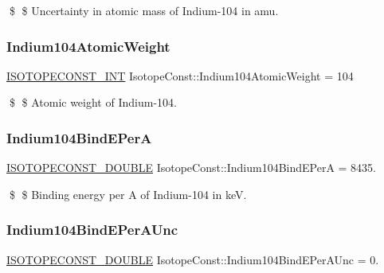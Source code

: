 \$ \$ Uncertainty in atomic mass of Indium-\/104 in amu. \mbox{\label{group___isotope_const-_indium-_in104_ga676ee40b5891e26c522fc0e9dc1ee539}} 
\subsubsection{\texorpdfstring{Indium104\+Atomic\+Weight}{Indium104AtomicWeight}}
{\footnotesize\ttfamily \mbox{\hyperlink{group___isotope_const-_macros_ga5f18360b3e99483a35c32d789e62621c}{I\+S\+O\+T\+O\+P\+E\+C\+O\+N\+S\+T\+\_\+\+I\+NT}} Isotope\+Const\+::\+Indium104\+Atomic\+Weight = 104}

\$ \$ Atomic weight of Indium-\/104. \mbox{\label{group___isotope_const-_indium-_in104_ga0b40476ffa59cae6be146df5ec3d7a75}} 
\subsubsection{\texorpdfstring{Indium104\+Bind\+E\+PerA}{Indium104BindEPerA}}
{\footnotesize\ttfamily \mbox{\hyperlink{group___isotope_const-_macros_ga8f45a7272ce02c0b4c65c44636ed719a}{I\+S\+O\+T\+O\+P\+E\+C\+O\+N\+S\+T\+\_\+\+D\+O\+U\+B\+LE}} Isotope\+Const\+::\+Indium104\+Bind\+E\+PerA = 8435.}

\$ \$ Binding energy per A of Indium-\/104 in keV. \mbox{\label{group___isotope_const-_indium-_in104_ga598143dd4b0408eb099b96c36f3cd114}} 
\subsubsection{\texorpdfstring{Indium104\+Bind\+E\+Per\+A\+Unc}{Indium104BindEPerAUnc}}
{\footnotesize\ttfamily \mbox{\hyperlink{group___isotope_const-_macros_ga8f45a7272ce02c0b4c65c44636ed719a}{I\+S\+O\+T\+O\+P\+E\+C\+O\+N\+S\+T\+\_\+\+D\+O\+U\+B\+LE}} Isotope\+Const\+::\+Indium104\+Bind\+E\+Per\+A\+Unc = 0.}

